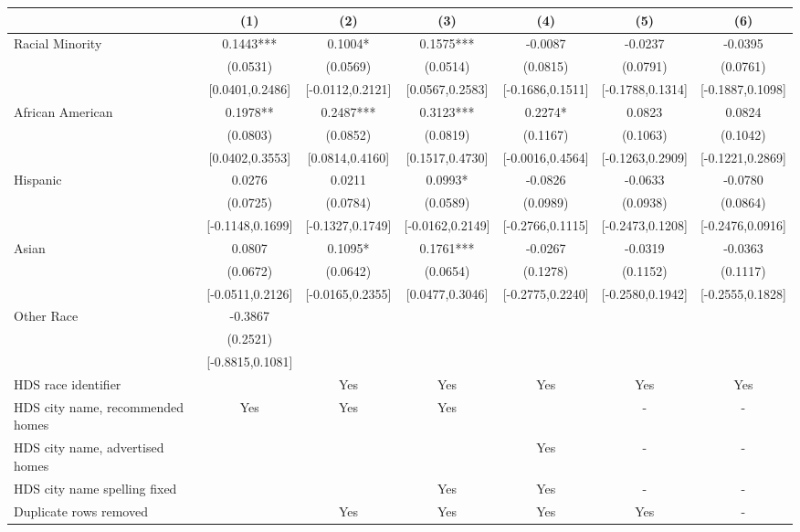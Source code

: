 \begin{table}[htbp]
{\begin{tabular}{l*{6}{c}}
                    \cmidrule(lr){2-2}\cmidrule(lr){3-3}\cmidrule(lr){4-4}\cmidrule(lr){5-5}\cmidrule(lr){6-6}\cmidrule(lr){7-7}
                    &\multicolumn{1}{c}{(1)}   &\multicolumn{1}{c}{(2)}   &\multicolumn{1}{c}{(3)}   &\multicolumn{1}{c}{(4)}   &\multicolumn{1}{c}{(5)}   &\multicolumn{1}{c}{(6)}\\
\midrule
Racial Minority & 0.1443*** & 0.1004* & 0.1575*** & -0.0087 & -0.0237 & -0.0395 \\
 & (0.0531) & (0.0569) & (0.0514) & (0.0815) & (0.0791) & (0.0761) \\
 & [0.0401,0.2486] & [-0.0112,0.2121] & [0.0567,0.2583] & [-0.1686,0.1511] & [-0.1788,0.1314] & [-0.1887,0.1098] \\
\midrule
African American & 0.1978** & 0.2487*** & 0.3123*** & 0.2274* & 0.0823 & 0.0824 \\
 & (0.0803) & (0.0852) & (0.0819) & (0.1167) & (0.1063) & (0.1042) \\
 & [0.0402,0.3553] & [0.0814,0.4160] & [0.1517,0.4730] & [-0.0016,0.4564] & [-0.1263,0.2909] & [-0.1221,0.2869] \\
Hispanic & 0.0276 & 0.0211 & 0.0993* & -0.0826 & -0.0633 & -0.0780 \\
 & (0.0725) & (0.0784) & (0.0589) & (0.0989) & (0.0938) & (0.0864) \\
 & [-0.1148,0.1699] & [-0.1327,0.1749] & [-0.0162,0.2149] & [-0.2766,0.1115] & [-0.2473,0.1208] & [-0.2476,0.0916] \\
Asian & 0.0807 & 0.1095* & 0.1761*** & -0.0267 & -0.0319 & -0.0363 \\
 & (0.0672) & (0.0642) & (0.0654) & (0.1278) & (0.1152) & (0.1117) \\
 & [-0.0511,0.2126] & [-0.0165,0.2355] & [0.0477,0.3046] & [-0.2775,0.2240] & [-0.2580,0.1942] & [-0.2555,0.1828] \\
Other Race & -0.3867 &  &  &  &  &  \\
 & (0.2521) &  &  &  &  &  \\
 & [-0.8815,0.1081] &  &  &  &  &  \\
\midrule
HDS race identifier & & Yes & Yes & Yes & Yes & Yes \\
HDS city name, recommended homes & Yes & Yes & Yes & & - & -\\
HDS city name, advertised homes &  &  &  & Yes & - & -\\
HDS city name spelling fixed & & & Yes & Yes & - & -\\
Duplicate rows removed &  & Yes & Yes & Yes & Yes & - \\

\end{tabular}}
\end{table}
